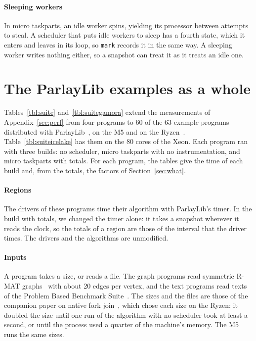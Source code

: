 \documentclass[sigplan,nonacm]{acmart}
\begin{document}
\paragraph{Sleeping workers}
%
In micro taskparts, an idle worker spins, yielding its processor
between attempts to steal.
%
A scheduler that puts idle workers to sleep has a fourth state, which
it enters and leaves in its loop, so \lstinline|mark| records it in
the same way.
%
A sleeping worker writes nothing either, so a snapshot can treat it as
it treats an idle one.

\section{The ParlayLib examples as a whole}
\label{sec:suite}

Tables~\ref{tbl:suite} and~\ref{tbl:suitegamora} extend the
measurements of Appendix~\ref{sec:perf} from four programs to 60 of
the 63 example programs distributed with
ParlayLib~\cite{blelloch20parlaylib}, on the M5 and on the
Ryzen~\cite{flexibench-suite,flexibench-suitegamora}.
%
Table~\ref{tbl:suiteicelake} has them on the 80 cores of the Xeon.
%
Each program ran with three builds: no scheduler, micro taskparts
with no instrumentation, and micro taskparts with totals.
%
For each program, the tables give the time of each build and, from the
totals, the factors of Section~\ref{sec:what}.

\paragraph{Regions}
%
The drivers of these programs time their algorithm with ParlayLib's
timer.
%
In the build with totals, we changed the timer alone: it takes a
snapshot wherever it reads the clock, so the totals of a region are
those of the interval that the driver times.
%
The drivers and the algorithms are unmodified.

\paragraph{Inputs}
%
A program takes a size, or reads a file.
%
The graph programs read symmetric R-MAT
graphs~\cite{chakrabarti2004rmat} with about 20 edges per vertex, and
the text programs read texts of the Problem Based Benchmark
Suite~\cite{shun2012pbbs}.
%
The sizes and the files are those of the companion paper on native
fork join~\cite{nativeforkjoin}, which chose each size on the Ryzen:
it doubled the size until one run of the algorithm with no scheduler
took at least a second, or until the process used a quarter of the
machine's memory.
%
The M5 runs the same sizes.
\end{document}
